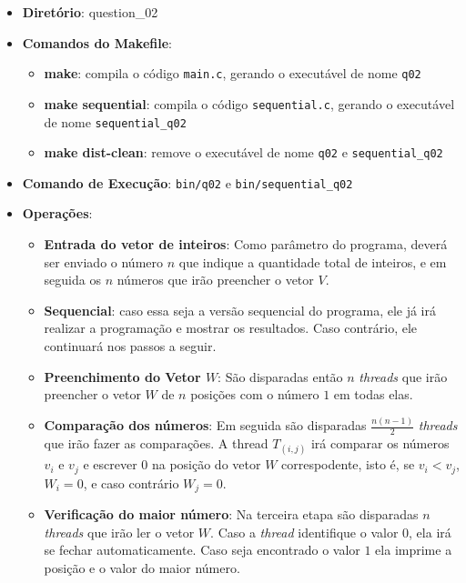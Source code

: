 \begin{itemize}
	\item{\textbf{Diretório}: question\_02}
	\item{\textbf{Comandos do Makefile}:
	\begin{itemize}
		\item{\textbf{make}: compila o código \texttt{main.c}, gerando o executável de nome \texttt{q02}}
		\item{\textbf{make sequential}: compila o código \texttt{sequential.c}, gerando o executável de nome \texttt{sequential\_q02}}
		\item{\textbf{make dist-clean}: remove o executável de nome \texttt{q02} e \texttt{sequential\_q02}}
	\end{itemize}}
	\item{\textbf{Comando de Execução}: \texttt{bin/q02} e \texttt{bin/sequential\_q02}}
	\item{\textbf{Operações}:
	\begin{itemize}
		\item{\textbf{Entrada do vetor de inteiros}: Como parâmetro do programa, deverá ser enviado o número $n$ que indique a quantidade total de inteiros, e em seguida os $n$ números que irão preencher o vetor $V$.}
		\item{\textbf{Sequencial}: caso essa seja a versão sequencial do programa, ele já irá realizar a programação e mostrar os resultados. Caso contrário, ele continuará nos passos a seguir.}
		\item{\textbf{Preenchimento do Vetor $W$}: São disparadas então $n$ \emph{threads} que irão preencher o vetor $W$ de $n$ posições com o número $1$ em todas elas.}
		\item{\textbf{Comparação dos números}: Em seguida são disparadas $\frac{n(n-1)}{2}$ \emph{threads} que irão fazer as comparações. A thread $T_{(i,j)}$ irá comparar os números $v_{i}$ e $v_{j}$ e escrever $0$ na posição do vetor $W$ correspodente, isto é, se $v_{i} < v_{j}$, $W_{i} = 0$, e caso contrário $W_{j} = 0$.}
		\item{\textbf{Verificação do maior número}: Na terceira etapa são disparadas $n$ \emph{threads} que irão ler o vetor $W$. Caso a \emph{thread} identifique o valor $0$, ela irá se fechar automaticamente. Caso seja encontrado o valor $1$ ela imprime a posição e o valor do maior número.}
	\end{itemize}}
\end{itemize}
